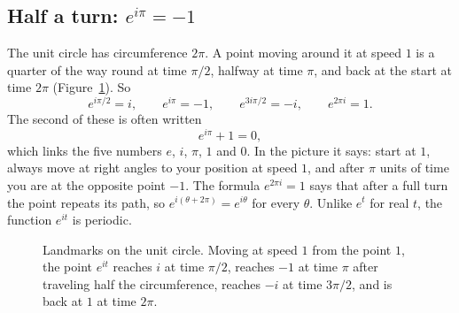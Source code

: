 \subsection{\texorpdfstring{Half a turn: $e^{i\pi} = -1$}{Half a turn: e to the i pi = -1}}
\label{ch30:sec-euler-pi}

The unit circle has circumference $2\pi$. A point moving around it at speed $1$ is a quarter of the way round at time $\pi/2$, halfway at time $\pi$, and back at the start at time $2\pi$ (Figure~\ref{ch30:fig-euler-landmarks}). So
\[
  e^{i\pi/2} = i, \qquad e^{i\pi} = -1, \qquad e^{3i\pi/2} = -i, \qquad e^{2\pi i} = 1.
\]
The second of these is often written
\[
  e^{i\pi} + 1 = 0,
\]
which links the five numbers $e$, $i$, $\pi$, $1$ and $0$. In the picture it says: start at $1$, always move at right angles to your position at speed $1$, and after $\pi$ units of time you are at the opposite point $-1$. The formula $e^{2\pi i} = 1$ says that after a full turn the point repeats its path, so $e^{i(\theta + 2\pi)} = e^{i\theta}$ for every $\theta$. Unlike $e^t$ for real $t$, the function $e^{it}$ is periodic.

\begin{figure}[htbp]
\centering
{}
\caption{Landmarks on the unit circle. Moving at speed $1$ from the point $1$, the point $e^{it}$ reaches $i$ at time $\pi/2$, reaches $-1$ at time $\pi$ after traveling half the circumference, reaches $-i$ at time $3\pi/2$, and is back at $1$ at time $2\pi$.}
\label{ch30:fig-euler-landmarks}
\end{figure}

